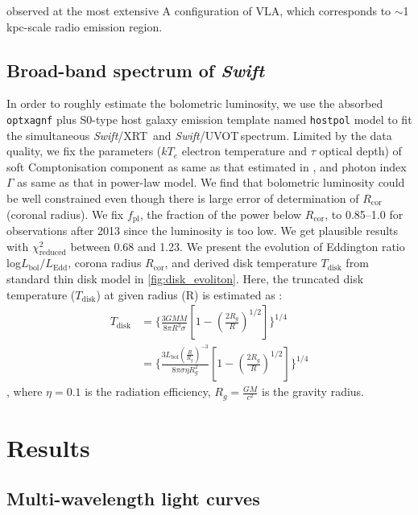 \documentclass[twocolumn]{aastex63}
\newcommand{\swift}{{\small \it Swift}}
\newcommand{\xrt}{{\small {\it Swift}/XRT}}
\newcommand{\uvot}{{\small {\it Swift}/UVOT}}
\begin{document}
observed at the most extensive A configuration of VLA, which corresponds to $\sim$1 kpc-scale radio emission region.

\subsection{Broad-band spectrum of \swift}
\label{swift-sed}

In order to roughly estimate the bolometric luminosity, we use the absorbed \texttt{optxagnf} plus S0-type host galaxy
emission template named \texttt{hostpol} \citep{2007ApJ...663...81P} model to fit the simultaneous \xrt\, and \uvot \,spectrum. Limited by the data quality, we fix the parameters ($kT_e$ electron temperature and $\tau$ optical depth) of soft Comptonisation component as same as that estimated in \citep{2018MNRAS.480.3898N}, and photon index $\Gamma$ as same as that in power-law model. We find that bolometric luminosity could be well constrained even though there is large error of determination of $R_\mathrm{cor}$ (coronal radius). We fix $f_\mathrm{pl}$, the fraction of the power below $R_\mathrm{cor}$, to 0.85--1.0 \citep[see also][]{2018MNRAS.480.3898N} for observations after 2013 since the luminosity is too low. We get plausible results with $\chi^2_\mathrm{reduced}$ between 0.68 and 1.23. We present the evolution of Eddington ratio log$L_\mathrm{bol}/L_\mathrm{Edd}$, corona radius $R_\mathrm{cor}$, and derived disk temperature $T_\mathrm{disk}$ from standard thin disk model in \autoref{fig:disk_evoliton}. Here,  the truncated disk temperature ($T_\mathrm{disk}$) at given radius (R) is estimated as :
\begin{equation}
\begin{aligned}
    T_\mathrm{disk} & = \{\frac{3GM\dot{M}}{8\pi R^3 \sigma}[1-(\frac{2 R_g}{R})^{1/2}]\}^{1/4} \\ & = \{\frac{3 L_\mathrm{bol} (\frac{R}{R_g})^{-3}}{8\pi \sigma \eta R_g^2}[1-(\frac{2 R_g}{R})^{1/2}]\}^{1/4}
\end{aligned}
\end{equation}, where $\eta=0.1$ is the radiation efficiency, $R_g=\frac{GM}{c^2}$ is the gravity radius.



\section{Results}
\label{sec:result}

\subsection{Multi-wavelength light curves}
\label{sec:multi-lc}
\end{document}
